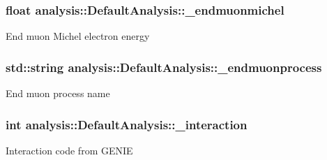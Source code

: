\subsubsection[{\texorpdfstring{\+\_\+endmuonmichel}{_endmuonmichel}}]{\setlength{\rightskip}{0pt plus 5cm}float analysis\+::\+Default\+Analysis\+::\+\_\+endmuonmichel\hspace{0.3cm}{\ttfamily [private]}}\hypertarget{classanalysis_1_1DefaultAnalysis_a3797bcb310074825add03ce03175fdc3}{}\label{classanalysis_1_1DefaultAnalysis_a3797bcb310074825add03ce03175fdc3}
End muon Michel electron energy 
\subsubsection[{\texorpdfstring{\+\_\+endmuonprocess}{_endmuonprocess}}]{\setlength{\rightskip}{0pt plus 5cm}std\+::string analysis\+::\+Default\+Analysis\+::\+\_\+endmuonprocess\hspace{0.3cm}{\ttfamily [private]}}\hypertarget{classanalysis_1_1DefaultAnalysis_a8cbb24a231e167258d2914f92bc4af22}{}\label{classanalysis_1_1DefaultAnalysis_a8cbb24a231e167258d2914f92bc4af22}
End muon process name 
\subsubsection[{\texorpdfstring{\+\_\+interaction}{_interaction}}]{\setlength{\rightskip}{0pt plus 5cm}int analysis\+::\+Default\+Analysis\+::\+\_\+interaction\hspace{0.3cm}{\ttfamily [private]}}\hypertarget{classanalysis_1_1DefaultAnalysis_a35c01b4be6d678e89cada927ab2ba45c}{}\label{classanalysis_1_1DefaultAnalysis_a35c01b4be6d678e89cada927ab2ba45c}
Interaction code from G\+E\+N\+IE 
